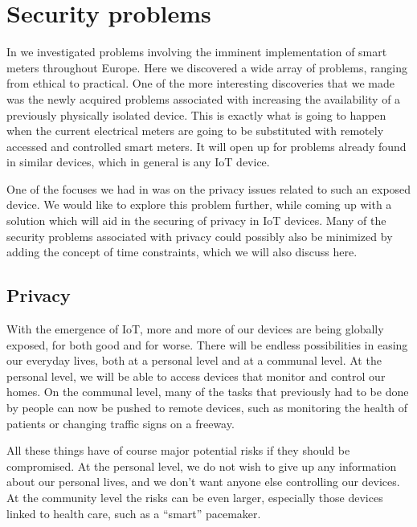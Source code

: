 
\section{Security problems}
In \cite{prespecialization} we investigated problems involving the imminent implementation of smart meters throughout Europe.
Here we discovered a wide array of problems, ranging from ethical to practical.
One of the more interesting discoveries that we made was the newly acquired problems associated with increasing the availability of a previously physically isolated device.
This is exactly what is going to happen when the current electrical meters are going to be substituted with remotely accessed and controlled smart meters.
It will open up for problems already found in similar devices, which in general is any IoT device.

One of the focuses we had in \cite{prespecialization} was on the privacy issues related to such an exposed device.
We would like to explore this problem further, while coming up with a solution which will aid in the securing of privacy in IoT devices.
Many of the security problems associated with privacy could possibly also be minimized by adding the concept of time constraints, which we will also discuss here.

\subsection{Privacy}
With the emergence of IoT, more and more of our devices are being globally exposed, for both good and for worse.
There will be endless possibilities in easing our everyday lives, both at a personal level and at a communal level.
At the personal level, we will be able to access devices that monitor and control our homes.
On the communal level, many of the tasks that previously had to be done by people can now be pushed to remote devices, such as monitoring the health of patients or changing traffic signs on a freeway.

All these things have of course major potential risks if they should be compromised.
At the personal level, we do not wish to give up any information about our personal lives, and we don't want anyone else controlling our devices.
At the community level the risks can be even larger, especially those devices linked to health care, such as a ``smart'' pacemaker.

